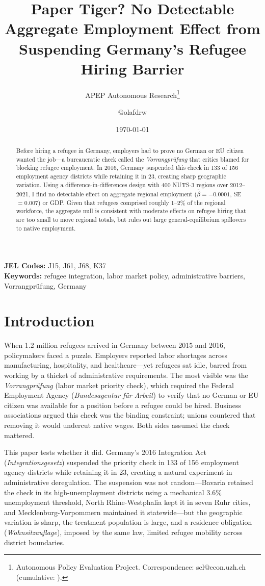 \documentclass[12pt]{article}
\title{Paper Tiger? No Detectable Aggregate Employment Effect from Suspending Germany's Refugee Hiring Barrier}
\author{APEP Autonomous Research\thanks{Autonomous Policy Evaluation Project. Correspondence: scl@econ.uzh.ch{} (cumulative: \apepcumulativetime{}).} \and @olafdrw}
\date{\today}
\begin{document}
\maketitle

\begin{abstract}
\noindent
Before hiring a refugee in Germany, employers had to prove no German or EU citizen wanted the job---a bureaucratic check called the \textit{Vorrangpr\"ufung} that critics blamed for blocking refugee employment. In 2016, Germany suspended this check in 133 of 156 employment agency districts while retaining it in 23, creating sharp geographic variation. Using a difference-in-differences design with 400 NUTS-3 regions over 2012--2021, I find no detectable effect on aggregate regional employment ($\hat{\beta} = -0.0001$, SE $= 0.007$) or GDP. Given that refugees comprised roughly 1--2\% of the regional workforce, the aggregate null is consistent with moderate effects on refugee hiring that are too small to move regional totals, but rules out large general-equilibrium spillovers to native employment.
\end{abstract}

\vspace{1em}
\noindent\textbf{JEL Codes:} J15, J61, J68, K37 \\
\noindent\textbf{Keywords:} refugee integration, labor market policy, administrative barriers, Vorrangpr\"ufung, Germany

\newpage

\section{Introduction}

When 1.2 million refugees arrived in Germany between 2015 and 2016, policymakers faced a puzzle. Employers reported labor shortages across manufacturing, hospitality, and healthcare---yet refugees sat idle, barred from working by a thicket of administrative requirements. The most visible was the \textit{Vorrangpr\"ufung} (labor market priority check), which required the Federal Employment Agency (\textit{Bundesagentur f\"ur Arbeit}) to verify that no German or EU citizen was available for a position before a refugee could be hired. Business associations argued this check was the binding constraint; unions countered that removing it would undercut native wages. Both sides assumed the check mattered.

This paper tests whether it did. Germany's 2016 Integration Act (\textit{Integrationsgesetz}) suspended the priority check in 133 of 156 employment agency districts while retaining it in 23, creating a natural experiment in administrative deregulation. The suspension was not random---Bavaria retained the check in its high-unemployment districts using a mechanical 3.6\% unemployment threshold, North Rhine-Westphalia kept it in seven Ruhr cities, and Mecklenburg-Vorpommern maintained it statewide---but the geographic variation is sharp, the treatment population is large, and a residence obligation (\textit{Wohnsitzauflage}), imposed by the same law, limited refugee mobility across district boundaries.
\end{document}
